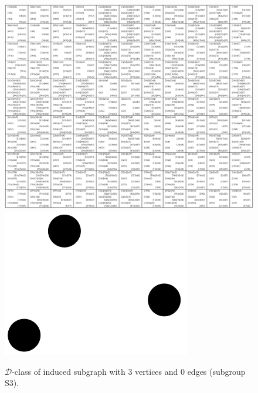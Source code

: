 \begin{appendices}
\begin{figure}[H]
\includegraphics[width=\textwidth,keepaspectratio]{images/x9/x9_3v_0e.png}
\includegraphics[scale=0.1]{images/x1/x1_3v_0e_vis.png}
\caption{$\mathcal{D}$-class of induced subgraph with 3 vertices and 0 edges (subgroup S3).}
\end{figure}


\end{appendices}
